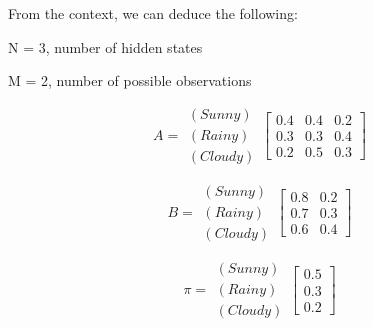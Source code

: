 \begin{example}
        From the context, we can deduce the following:
        \begin{center}
                    N = 3, number of hidden states

                    M = 2, number of possible observations

                    \begin{equation}
                    A = 
                    \begin{array}{c}
                        (Sunny) \\
                        (Rainy) \\
                        (Cloudy)
                    \end{array}
                    \begin{bmatrix}
                        0.4 & 0.4 & 0.2 \\
                        0.3 & 0.3 & 0.4 \\
                        0.2 & 0.5 & 0.3 
                        \end{bmatrix}
                    \end{equation}

                    \begin{equation}
                    B = 
                    \begin{array}{c}
                        (Sunny) \\
                        (Rainy) \\
                        (Cloudy)
                    \end{array}
                    \begin{bmatrix}
                        0.8 & 0.2 \\
                        0.7 & 0.3 \\
                        0.6 & 0.4 
                        \end{bmatrix}
                    \end{equation}

                    \begin{equation}
                    \pi = 
                    \begin{array}{c}
                        (Sunny) \\
                        (Rainy) \\
                        (Cloudy)
                    \end{array}
                    \begin{bmatrix}
                        0.5 \\
                        0.3 \\
                        0.2 
                        \end{bmatrix}
                    \end{equation}
        \end{center}


\end{example}
